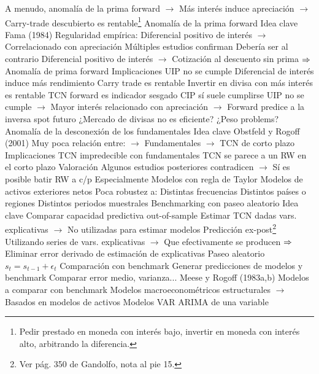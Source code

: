\documentclass{nuevotema}
\begin{document}
\begin{esquemal}
				\4[] A menudo, anomalía de la prima forward
				\4[] $\to$ Más interés induce apreciación
				\4[] $\to$ Carry-trade descubierto es rentable\footnote{Pedir prestado en moneda con interés bajo, invertir en moneda con interés alto, arbitrando la diferencia.}
		\2 Anomalía de la prima forward
			\3 Idea clave
				\4 Fama (1984)
				\4 Regularidad empírica:
				\4[] Diferencial positivo de interés
				\4[] $\to$ Correlacionado con apreciación
				\4 Múltiples estudios confirman
				\4 Debería ser al contrario
				\4[] Diferencial positivo de interés
				\4[] $\to$ Cotización al descuento sin prima
				\4[] $\Rightarrow$ Anomalía de prima forward
			\3 Implicaciones
				\4 UIP no se cumple
				\4[] Diferencial de interés induce más rendimiento
				\4 Carry trade es rentable
				\4[] Invertir en divisa con más interés es rentable
				\4 TCN forward es indicador sesgado
				\4[] CIP sí suele cumplirse
				\4[] UIP no se cumple
				\4[] $\to$ Mayor interés relacionado con apreciación
				\4[] $\to$ Forward predice a la inversa spot futuro
				\4[] ¿Mercado de divisas no es eficiente?
				\4[] ¿Peso problems?
		\2 Anomalía de la desconexión de los fundamentales
			\3 Idea clave
				\4 Obstfeld y Rogoff (2001)
				\4 Muy poca relación entre:
				\4[] $\to$ Fundamentales
				\4[] $\to$ TCN de corto plazo
			\3 Implicaciones
				\4 TCN impredecible con fundamentales
				\4 TCN se parece a un RW en el corto plazo
			\3 Valoración
				\4 Algunos estudios posteriores contradicen
				\4[] $\to$ Sí es posible batir RW a c/p
				\4 Especialmente
				\4[] Modelos con regla de Taylor
				\4[] Modelos de activos exteriores netos
				\4 Poca robustez a:
				\4[] Distintas frecuencias
				\4[] Distintos países o regiones
				\4[] Distintos periodos muestrales
		\2 Benchmarking con paseo aleatorio
			\3 Idea clave
				\4 Comparar capacidad predictiva out-of-sample
				\4[] Estimar TCN dadas vars. explicativas
				\4[] $\to$ No utilizadas para estimar modelos
				\4 Predicción ex-post\footnote{Ver pág. 350 de Gandolfo, nota al pie 15.}
				\4[] Utilizando series de vars. explicativas
				\4[] $\to$ Que efectivamente se producen
				\4[] $\Rightarrow$ Eliminar error derivado de estimación de explicativas
				\4 Paseo aleatorio
				\4[] $s_t = s_{t-1} + \epsilon_t$
				\4 Comparación con benchmark
				\4[] Generar predicciones de modelos y benchmark
				\4[] Comparar error medio, varianza...
			\3 Meese y Rogoff (1983a,b)
				\4 Modelos a comparar con benchmark
				\4[] Modelos macroeconométricos estructurales
				\4[] $\to$ Basados en modelos de activos
				\4[] Modelos VAR
				\4[] ARIMA de una variable

\end{esquemal}
\end{document}

